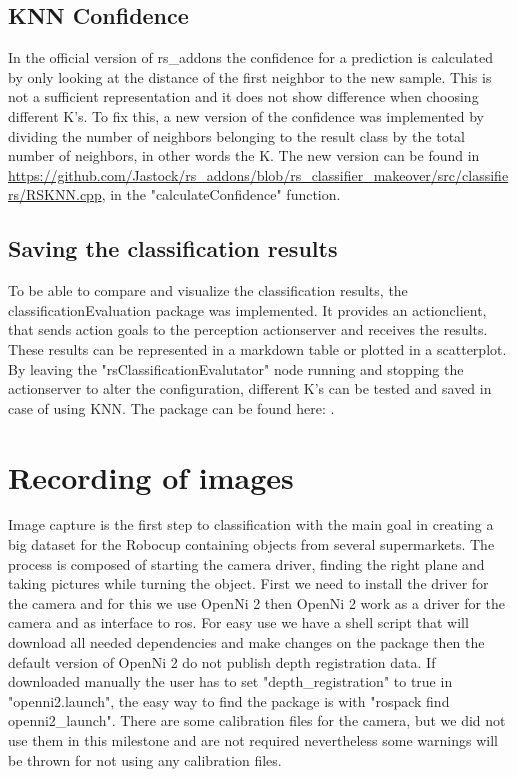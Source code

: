 \documentclass[main.tex]{subfiles}
\begin{document}
			\subsection{KNN Confidence}
			In the official version of rs\_addons the confidence for a prediction is calculated by only looking at the distance of the first neighbor to the new 					sample. This is not a sufficient representation and it does not show difference when choosing different K's. To fix this, a new version of the 						confidence was implemented by dividing the number of neighbors belonging to the result class by the total number of neighbors, in other words the K.
			The new version can be found in \url{https://github.com/Jastock/rs_addons/blob/rs_classifier_makeover/src/classifiers/RSKNN.cpp}, in the 								"calculateConfidence" function.  
			
			\subsection{Saving the classification results}
			To be able to compare and visualize the classification results, the classificationEvaluation package was implemented. It provides an actionclient, that 			sends action goals to the perception actionserver and receives the results. These results can be represented in a markdown table or plotted in a 						scatterplot. By leaving the "rsClassificationEvalutator" node running and stopping the actionserver to alter the configuration, different K's can be 					tested and saved in case of using KNN. The package can be found here: . 
		
		
		\section{Recording of images}  
		Image capture is the first step to classification with the main goal in creating a big dataset
		for the Robocup containing objects from several supermarkets.
		The process is composed of starting the camera driver,
		finding the right plane and taking pictures while turning the object.
		First we need to install the driver for the camera and for this we use OpenNi 2
		then OpenNi 2 work as a driver for the camera and as interface to ros.
		For easy use we have a shell script that will download all needed dependencies
		and make changes on the package then the default version of OpenNi 2 do
 		not publish depth registration data. 
		If downloaded manually the user has to set "depth\_registration" to true in "openni2.launch", 
		the easy way to find the package is with "rospack find openni2\_launch". 
		There are some calibration files for the camera, but we did not use them in this milestone 
		and are not required nevertheless some warnings will be thrown for not using any calibration files.
\end{document}
